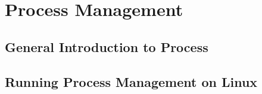 \chapter{Process Management} \label{ch6}


\section{General Introduction to Process}

\section{Running Process Management on Linux}
















